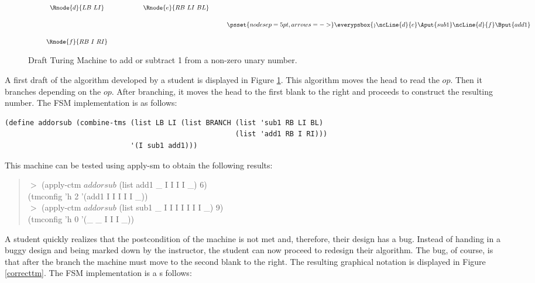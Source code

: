 \documentclass{eptcs}
\begin{document}
\begin{figure}[t]
\[
\setlength{\arraycolsep}{1cm}
\def\tX{\tilde{\tilde{X}}}
\begin{array}{cc}
\Rnode{d}{LB\ LI} & \Rnode{e}{RB\ LI\ BL } \\[1.5cm]
\Rnode{f}{RB\ I\ RI}
\end{array}
\psset{nodesep=5pt,arrows=->}
\everypsbox{\scriptstyle}
\ncLine{d}{e}\Aput{sub1}
\ncLine{d}{f}\Bput{add1}
\]
\caption{Draft Turing Machine to add or subtract 1 from a non-zero unary number.}
\label{wrongtm}
\end{figure}
A first draft of the algorithm developed by a student is displayed in Figure \ref{wrongtm}. This algorithm moves the head to read the $\mathit{op}$. Then it branches depending on the $\mathit{op}$. After branching, it moves the head to the first blank to the right and proceeds to construct the resulting number. The \textsf{FSM} implementation is as follows:
\begin{verbatim}
(define addorsub (combine-tms (list LB LI (list BRANCH (list 'sub1 RB LI BL)
                                                       (list 'add1 RB I RI)))
                              '(I sub1 add1)))
\end{verbatim}
This machine can be tested using \textsf{apply-sm} to obtain the following results:
\begin{quote}
$>$ (apply-ctm $addorsub$ (list add1 \_ I I I I \_) 6)\\
(tmconfig 'h 2 '(add1 I I I I I \_))\\
$>$ (apply-ctm $addorsub$ (list sub1 \_ I I I I I I I \_) 9)\\
(tmconfig 'h 0 '(\_ \_ I I I \_))
\end{quote}
A student quickly realizes that the postcondition of the machine is not met and, therefore, their design has a bug. Instead of handing in a buggy design and being marked down by the instructor, the student can now proceed to redesign their algorithm. The bug, of course, is that after the branch the machine must move to the second blank to the right. The resulting graphical notation is displayed in Figure \ref{correcttm}. The \textsf{FSM} implementation is a s follows:
\end{document}
